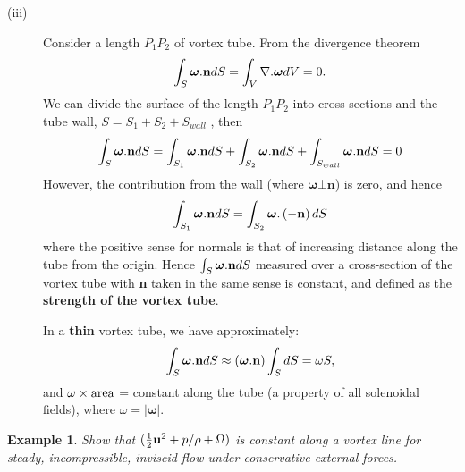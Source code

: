 \documentclass[twoside,a4paper,11pt]{report}
\newtheorem{exmp}{Example}}
\begin{document}
\begin{description}
\item[(iii)] Consider a length $P_{1}P_{2}$ of vortex tube. From the divergence 
theorem
\[
\int_S {{\bm{\omega}}. {{\bf n}}dS} =\int_V {\nabla . {\bm{\omega}} dV} 
=0.
\]
We can divide the surface of the length $P_{1} P_{2}$ into cross-sections 
and the tube wall,
$S = S_{1} + S_{2} + S_{{wall}}$ , then
\[
\int_S {{\bm{\omega}}. {{\bf n}}dS} =\int_{S_1 } {{\bm{\omega}}. {\rm 
{\bf n}}dS} +\int_{S_2 } {{\bm{\omega}}. {{\bf n}}dS} 
+\int_{S_{wall} } {{\bm{\omega}}. {{\bf n}}dS} =0
\]
However, the contribution from the wall (where ${\bm{\omega}}\bot 
\textbf{n}$) is zero, and hence
\[
\int_{S_1 } {{\bm{\omega}}. {{\bf n}}dS} =\int_{S_2 } {{\bm{\omega}}. 
\left( {-{{\bf n}}} \right)dS} 
\]
where the positive sense for normals is that of increasing distance along 
the tube from the origin. Hence $\int_{S} {{\bm\omega}. {{\bf 
n}}dS} $ measured over a cross-section of the vortex tube with \textbf{n} 
taken in the same sense is constant, and defined as the \textbf{strength of 
the vortex tube}.

In a \textbf{thin} vortex tube, we have approximately:
\[
\int_S {{\bm{\omega}}. {{\bf n}}dS} \approx \left( {{\bm{\omega}}. {{\bf 
n}}} \right)\int_S {dS} =\omega S,
\]
and $\omega \times \hbox{area}$ = constant along the tube (a property of all 
solenoidal fields), where $\omega = | {\bm{\omega}}|$. 
\end{description}


\begin{exmp}
Show that $(\textstyle{1 \over 2}{{\bf u}}^2+p/ \rho +\Omega 
)$ is constant along a vortex line for steady, incompressible, inviscid flow 
under conservative external forces.
\end{exmp}





\end{document}
